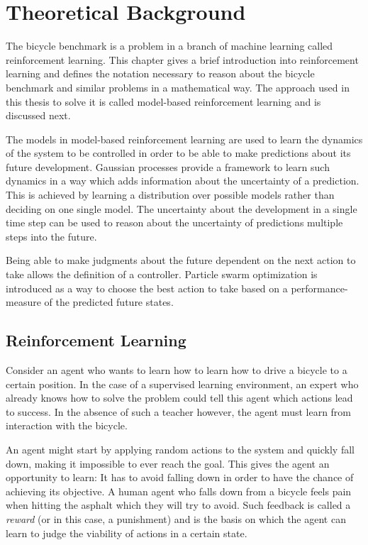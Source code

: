 \chapter{Theoretical Background}
\label{cha:theory}
The bicycle benchmark is a problem in a branch of machine learning called reinforcement learning.
This chapter gives a brief introduction into reinforcement learning and defines the notation necessary to reason about the bicycle benchmark and similar problems in a mathematical way.
The approach used in this thesis to solve it is called model-based reinforcement learning and is discussed next.

The models in model-based reinforcement learning are used to learn the dynamics of the system to be controlled in order to be able to make predictions about its future development.
Gaussian processes provide a framework to learn such dynamics in a way which adds information about the uncertainty of a prediction.
This is achieved by learning a distribution over possible models rather than deciding on one single model.
The uncertainty about the development in a single time step can be used to reason about the uncertainty of predictions multiple steps into the future.

Being able to make judgments about the future dependent on the next action to take allows the definition of a controller.
Particle swarm optimization is introduced as a way to choose the best action to take based on a performance-measure of the predicted future states.

\section{Reinforcement Learning}
Consider an agent who wants to learn how to learn how to drive a bicycle to a certain position.
In the case of a supervised learning environment, an expert who already knows how to solve the problem could tell this agent which actions lead to success.
In the absence of such a teacher however, the agent must learn from interaction with the bicycle.

An agent might start by applying random actions to the system and quickly fall down, making it impossible to ever reach the goal.
This gives the agent an opportunity to learn:
It has to avoid falling down in order to have the chance of achieving its objective.
A human agent who falls down from a bicycle feels pain when hitting the asphalt which they will try to avoid.
Such feedback is called a \emph{reward} (or in this case, a punishment) and is the basis on which the agent can learn to judge the viability of actions in a certain state.

